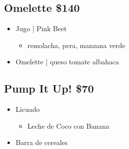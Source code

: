 \subsection{Omelette \textbar{} \$140}\label{omelette-140}
\begin{itemize} \tightlist
\item   Jugo | Pink Beet
  \begin{itemize}
   \item remolacha, pera, manzana verde 
  \end{itemize}

\item   Omelette | queso tomate albahaca
\end{itemize}

\bigskip

\subsection{Pump It Up! \textbar{} \$70}\label{pump-it-up-70}

\begin{itemize}
\tightlist
\item Licuado 
  \begin{itemize}
   \item Leche de Coco con Banana
  \end{itemize}

\item Barra de cereales %
\end{itemize}
